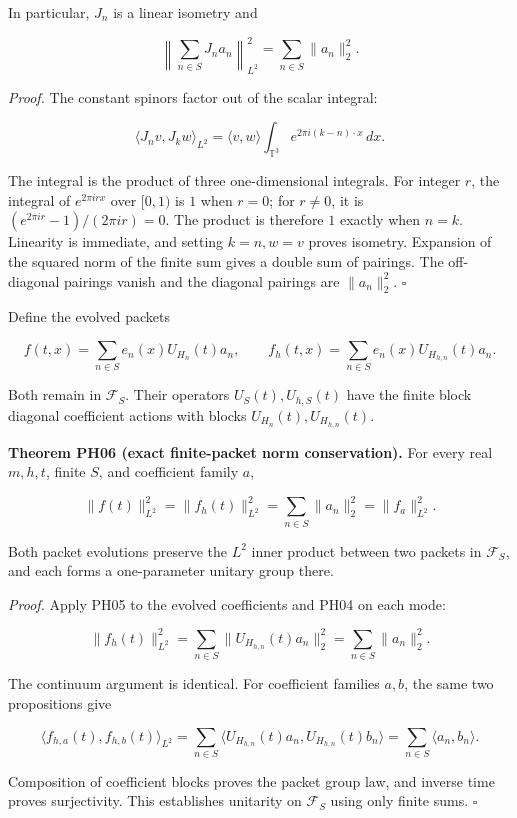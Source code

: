 In particular, \(J_n\) is a linear isometry and

\[
\left\|\sum_{n\in S}J_na_n\right\|_{L^2}^2
=\sum_{n\in S}\|a_n\|_2^2.
\]

\emph{Proof.} The constant spinors factor out of the scalar integral:

\[
\langle J_nv,J_kw\rangle_{L^2}
=\langle v,w\rangle\int_{\mathbb T^3}e^{2\pi i(k-n)\cdot x}\,dx.
\]

The integral is the product of three one-dimensional integrals. For
integer \(r\), the integral of \(e^{2\pi irx}\) over \([0,1)\) is \(1\)
when \(r=0\); for \(r\ne0\), it is \((e^{2\pi ir}-1)/(2\pi ir)=0\). The
product is therefore \(1\) exactly when \(n=k\). Linearity is immediate,
and setting \(k=n,w=v\) proves isometry. Expansion of the squared norm
of the finite sum gives a double sum of pairings. The off-diagonal
pairings vanish and the diagonal pairings are \(\|a_n\|_2^2\).
\(\square\)

Define the evolved packets

\[
f(t,x)=\sum_{n\in S}e_n(x)U_{H_n}(t)a_n,\qquad
f_h(t,x)=\sum_{n\in S}e_n(x)U_{H_{h,n}}(t)a_n.
\]

Both remain in \(\mathcal F_S\). Their operators \(U_S(t),U_{h,S}(t)\)
have the finite block diagonal coefficient actions with blocks
\(U_{H_n}(t),U_{H_{h,n}}(t)\).

\textbf{Theorem PH06 (exact finite-packet norm conservation).} For every
real \(m,h,t\), finite \(S\), and coefficient family \(a\),

\[
\|f(t)\|_{L^2}^2=\|f_h(t)\|_{L^2}^2
=\sum_{n\in S}\|a_n\|_2^2=\|f_a\|_{L^2}^2.
\]

Both packet evolutions preserve the \(L^2\) inner product between two
packets in \(\mathcal F_S\), and each forms a one-parameter unitary
group there.

\emph{Proof.} Apply PH05 to the evolved coefficients and PH04 on each
mode:

\[
\|f_h(t)\|_{L^2}^2
=\sum_{n\in S}\|U_{H_{h,n}}(t)a_n\|_2^2
=\sum_{n\in S}\|a_n\|_2^2.
\]

The continuum argument is identical. For coefficient families \(a,b\),
the same two propositions give

\[
\langle f_{h,a}(t),f_{h,b}(t)\rangle_{L^2}
=\sum_{n\in S}
\langle U_{H_{h,n}}(t)a_n,U_{H_{h,n}}(t)b_n\rangle
=\sum_{n\in S}\langle a_n,b_n\rangle.
\]

Composition of coefficient blocks proves the packet group law, and
inverse time proves surjectivity. This establishes unitarity on
\(\mathcal F_S\) using only finite sums. \(\square\)

